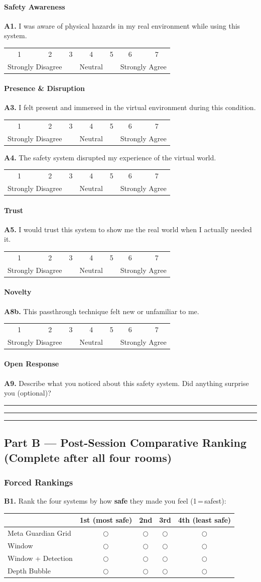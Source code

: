 \documentclass{styling/vgtc} %
\makeatletter
\newcommand{\likert}{%
  \par\smallskip
  \begin{center}\small
  \begin{tabular}{@{}ccccccc@{}}
    1 & 2 & 3 & 4 & 5 & 6 & 7 \\[-2pt]
    \multicolumn{2}{l}{\scriptsize Strongly Disagree} &
    & {\scriptsize Neutral} &
    & \multicolumn{2}{r}{\scriptsize Strongly Agree}
  \end{tabular}
  \end{center}\smallskip\noindent}
\newcommand{\answerlines}{%
  \par\vspace{4pt}%
  \noindent\rule{\linewidth}{0.3pt}\par\vspace{10pt}%
  \noindent\rule{\linewidth}{0.3pt}\par\vspace{10pt}%
  \noindent\rule{\linewidth}{0.3pt}\par\vspace{6pt}}
\makeatother
\begin{document}
\paragraph{Safety Awareness}
\noindent\textbf{A1.} I was aware of physical hazards in my real environment while using this system.\likert

\paragraph{Presence \& Disruption}
\noindent\textbf{A3.} I felt present and immersed in the virtual environment during this condition.\likert

\noindent\textbf{A4.} The safety system disrupted my experience of the virtual world.\likert

\paragraph{Trust}
\noindent\textbf{A5.} I would trust this system to show me the real world when I actually needed it.\likert

\paragraph{Novelty}
\noindent\textbf{A8b.} This passthrough technique felt new or unfamiliar to me.\likert

\paragraph{Open Response}
\noindent\textbf{A9.} Describe what you noticed about this safety system. Did anything surprise you (optional)?\answerlines

\bigskip
\subsection*{Part B --- Post-Session Comparative Ranking \textnormal{\small(Complete after all four rooms)}}

\subsubsection*{Forced Rankings}

\noindent\textbf{B1.} Rank the four systems by how \textbf{safe} they made you feel (1\,=\,safest):

\smallskip
\begin{center}
\begin{tabular}{@{}lcccc@{}}
\toprule
 & \textbf{1st (most safe)} & \textbf{2nd} & \textbf{3rd} & \textbf{4th (least safe)} \\
\midrule
Meta Guardian Grid & $\bigcirc$ & $\bigcirc$ & $\bigcirc$ & $\bigcirc$ \\
Window             & $\bigcirc$ & $\bigcirc$ & $\bigcirc$ & $\bigcirc$ \\
Window + Detection & $\bigcirc$ & $\bigcirc$ & $\bigcirc$ & $\bigcirc$ \\
Depth Bubble       & $\bigcirc$ & $\bigcirc$ & $\bigcirc$ & $\bigcirc$ \\
\bottomrule
\end{tabular}
\end{center}
\end{document}
